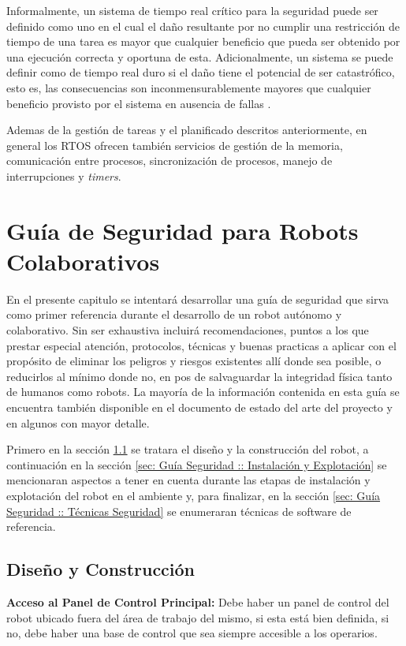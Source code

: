 \documentclass[withindex,glossary]{cam-thesis}
\begin{document}
Informalmente, un sistema de tiempo real crítico para la seguridad puede ser definido como uno en el cual el daño resultante por no cumplir una restricción de tiempo de una tarea es mayor que cualquier beneficio que pueda ser obtenido por una ejecución correcta y oportuna de esta. Adicionalmente, un sistema se puede definir como de tiempo real duro si el daño tiene el potencial de ser catastrófico, esto es, las consecuencias son inconmensurablemente mayores que cualquier beneficio provisto por el sistema en ausencia de fallas \cite{audsley1990real}.

Ademas de la gestión de tareas y el planificado descritos anteriormente, en general los RTOS ofrecen también servicios de gestión de la memoria, comunicación entre procesos, sincronización de procesos, manejo de interrupciones y \textit{timers}.

\chapter{Guía de Seguridad para Robots Colaborativos}
En el presente capitulo se intentará desarrollar una guía de seguridad que sirva como primer referencia durante el desarrollo de un robot autónomo y colaborativo. Sin ser exhaustiva incluirá recomendaciones, puntos a los que prestar especial atención, protocolos, técnicas y buenas practicas a aplicar con el propósito de eliminar los peligros y riesgos existentes allí donde sea posible, o reducirlos al mínimo donde no, en pos de salvaguardar la integridad física tanto de humanos como robots. La mayoría de la información contenida en esta guía se encuentra también disponible en el documento de estado del arte del proyecto \cite{RASSOA} y en algunos con mayor detalle.

Primero en la sección \ref{sec: Guía Seguridad :: Diseño y Construcción} se tratara el diseño y la construcción del robot, a continuación en la sección \ref{sec: Guía Seguridad :: Instalación y Explotación} se mencionaran aspectos a tener en cuenta durante las etapas de instalación y explotación del robot en el ambiente y, para finalizar, en la sección \ref{sec: Guía Seguridad :: Técnicas Seguridad} se enumeraran técnicas de software de referencia.

\section{Diseño y Construcción} \label{sec: Guía Seguridad :: Diseño y Construcción}
\textbf{Acceso al Panel de Control Principal:} Debe haber un panel de control del robot ubicado fuera del área de trabajo del mismo, si esta está bien definida, si no, debe haber una base de control que sea siempre accesible a los operarios.
\end{document}
